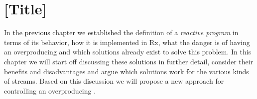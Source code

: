 \chapter{[Title]}
In the previous chapter we established the definition of a \textit{reactive program} in terms of its behavior, how it is implemented in Rx, what the danger is of having an overproducing \obs and which solutions already exist to solve this problem. In this chapter we will start off discussing these solutions in further detail, consider their benefits and disadvantages and argue which solutions work for the various kinds of streams. Based on this discussion we will propose a new approach for controlling an overproducing \obs.





